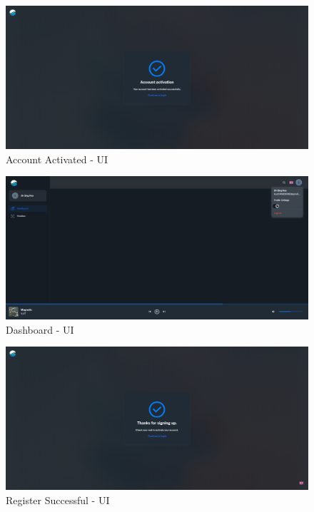 \section{}
\label{app:appendix-c}
\begin{figure}[h!]
    \centering
    \includegraphics[width=14cm]{Images/acc-activated.png}
    \caption{Account Activated - UI}
    \label{fig:acc-activated}
\end{figure}
\begin{figure}[h!]
    \centering
    \includegraphics[width=14cm]{Images/dashboard.png}
    \caption{Dashboard - UI}
    \label{fig:dashboard-ui}
\end{figure}
\begin{figure}[h!]
    \centering
    \includegraphics[width=14cm]{Images/register-successfull-ui.png}
    \caption{Register Successful - UI}
    \label{fig:register-succesfull}
\end{figure}

